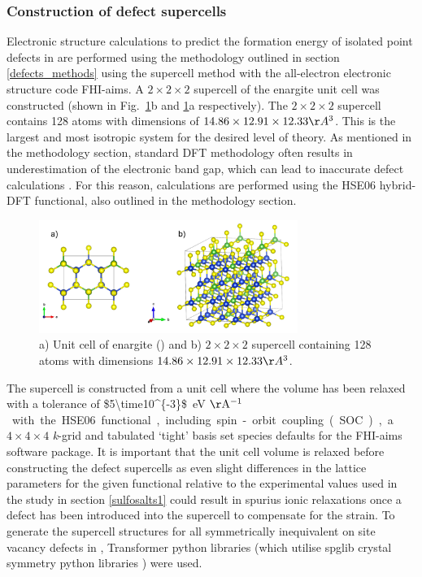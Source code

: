 \documentclass[11pt, twoside]{report}
\begin{document}
\subsubsection{Construction of defect supercells}

Electronic structure calculations to predict the formation energy of isolated point defects in {\enargite} are performed using the methodology outlined in section \ref{defects_methods} using the supercell method with the all-electron electronic structure code FHI-aims. A $2\times2\times2$ supercell of the enargite unit cell was constructed (shown in Fig.~\ref{enargite_supercell}b and \ref{enargite_supercell}a respectively). The $2\times2\times2$ supercell contains 128 atoms with dimensions of $14.86\times12.91\times12.33 \AA^3$. This is the largest and most isotropic system for the desired level of theory. As mentioned in the methodology section, standard DFT methodology often results in underestimation of the electronic band gap, which can lead to inaccurate defect calculations \cite{Lany_defects, hybrids_defect_calcs}. For this reason, calculations are performed using the HSE06 hybrid-DFT functional, also outlined in the methodology section.

\begin{figure}[h!]
    \centering
    \includegraphics[width=0.75\textwidth]{figures/enargite_supercell.png}
    \caption{a) Unit cell of enargite ({\enargite}) and b) $2\times2\times2$ supercell containing 128 atoms with dimensions $14.86\times12.91\times12.33 \AA^3$.}
    \label{enargite_supercell}
\end{figure}

The supercell is constructed from a unit cell where the volume has been relaxed with a tolerance of \SI{$5\time10^{-3}$}{eV $\mathrm{\AA^{-1}}$} with the HSE06 functional, including spin-orbit coupling (SOC), a $4\times4\times4$ \textit{k}-grid and tabulated `tight' basis set species defaults for the FHI-aims software package. It is important that the unit cell volume is relaxed before constructing the defect supercells as even slight differences in the lattice parameters for the given functional relative to the experimental values used in the study in section \ref{sulfosalts1} could result in spurius ionic relaxations once a defect has been introduced into the supercell to compensate for the strain. To generate the supercell structures for all symmetrically inequivalent on site vacancy defects in {\enargite}, Transformer python libraries \cite{Transformer} (which utilise spglib crystal symmetry python libraries \cite{spglib}) were used.
\end{document}

